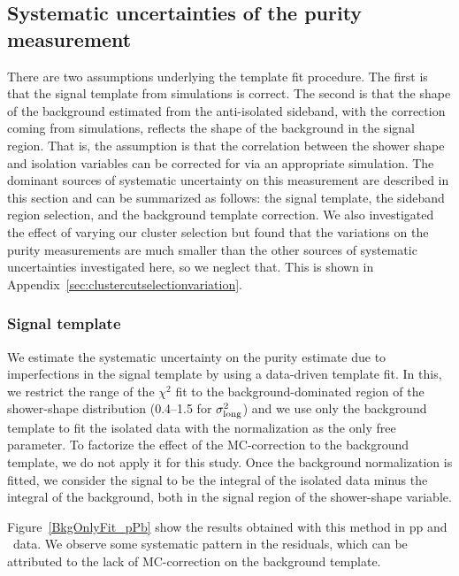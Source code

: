 \FloatBarrier
\subsection{Systematic uncertainties of the purity measurement}
\label{sec:puritysystematics}
There are two assumptions underlying the template fit procedure. The first is that the signal template from simulations is correct. The second is that the shape of the background estimated from the anti-isolated sideband, with the correction coming from simulations, reflects the shape of the background in the signal region. That is, the assumption is that the correlation between the shower shape and isolation variables can be corrected for via an appropriate simulation. The dominant sources of systematic uncertainty on this measurement are described in this section and can be summarized as follows: the signal template, the sideband region selection, and the background template correction. We also investigated the effect of varying our cluster selection but found that the variations on the purity measurements are much smaller than the other sources of systematic uncertainties investigated here, so we neglect that. This is shown in Appendix~\ref{sec:clustercutselectionvariation}. 

\subsubsection{Signal template}
We estimate the systematic uncertainty on the purity estimate due to imperfections in the signal template by using a data-driven template fit. In this, we restrict the range of the $\chi^{2}$ fit to the background-dominated region of the shower-shape distribution (0.4--1.5 for $\sigma^{2}_{\mathrm{long}}$) and we use only the background template to fit the isolated data with the normalization as the only free parameter. To factorize the effect of the MC-correction to the background template, we do not apply it for this study. Once the background normalization is fitted, we consider the signal to be the integral of the isolated data minus the integral of the background, both in the signal region of the shower-shape variable. 

Figure~\ref{BkgOnlyFit_pPb} show the results obtained with this method in pp and \pPb~data. We observe some systematic pattern in the residuals, which can be attributed to the lack of MC-correction on the background template. 


